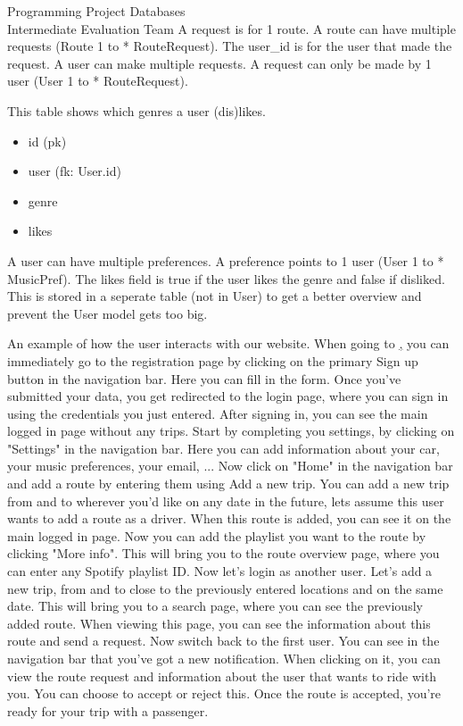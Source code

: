 \documentclass{article}
\newcounter{team}
\begin{document}
\begin{Minutes}{Programming Project Databases \\ Intermediate Evaluation Team }
            A request is for 1 route. A route can have multiple requests (Route 1 to * RouteRequest).
            The user\_id is for the user that made the request.
            A user can make multiple requests. A request can only be made by 1 user (User 1 to * RouteRequest).

            This table shows which genres a user (dis)likes.
            \begin{itemize}
                \item id (pk)
                \item user (fk: User.id)
                \item genre
                \item likes
            \end{itemize}

            A user can have multiple preferences. A preference points to 1 user (User 1 to * MusicPref).
            The likes field is true if the user likes the genre and false if disliked.
            This is stored in a seperate table (not in User) to get a better overview and prevent the User model gets too big.

        An example of how the user interacts with our website.
        When going to \href{team6.ppdb.me}, you can immediately go to the registration page by clicking on the primary Sign up button in the navigation bar. Here you can fill in the form. Once you've submitted your data, you get redirected to the login page, where you can sign in using the credentials you just entered. After signing in, you can see the main logged in page without any trips. Start by completing you settings, by clicking on "Settings" in the navigation bar. Here you can add information about your car, your music preferences, your email, ... Now click on "Home" in the navigation bar and add a route by entering them using Add a new trip. You can add a new trip from and to wherever you'd like on any date in the future, lets assume this user wants to add a route as a driver. When this route is added, you can see it on the main logged in page. Now you can add the playlist you want to the route by clicking "More info". This will bring you to the route overview page, where you can enter any Spotify playlist ID. Now let's login as another user. Let's add a new trip, from and to close to the previously entered locations and on the same date. This will bring you to a search page, where you can see the previously added route. When viewing this page, you can see the information about this route and send a request. Now switch back to the first user. You can see in the navigation bar that you've got a new notification. When clicking on it, you can view the route request and information about the user that wants to ride with you. You can choose to accept or reject this. Once the route is accepted, you're ready for your trip with a passenger.


\end{Minutes}
\end{document}
